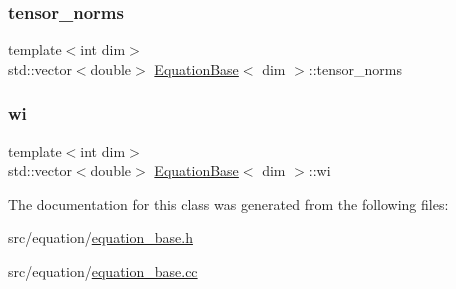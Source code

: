 \mbox{\label{class_equation_base_a2e5e8e486a1e6994c606dc05227752dd}} 
\subsubsection{\texorpdfstring{tensor\+\_\+norms}{tensor\_norms}}
{\footnotesize\ttfamily template$<$int dim$>$ \\
std\+::vector$<$double$>$ \hyperlink{class_equation_base}{Equation\+Base}$<$ dim $>$\+::tensor\+\_\+norms\hspace{0.3cm}{\ttfamily [protected]}}

\mbox{\label{class_equation_base_a46388ad4bea156033fa98fd8f484a068}} 
\subsubsection{\texorpdfstring{wi}{wi}}
{\footnotesize\ttfamily template$<$int dim$>$ \\
std\+::vector$<$double$>$ \hyperlink{class_equation_base}{Equation\+Base}$<$ dim $>$\+::wi\hspace{0.3cm}{\ttfamily [protected]}}



The documentation for this class was generated from the following files\+:\begin{DoxyCompactItemize}
\item 
src/equation/\hyperlink{equation__base_8h}{equation\+\_\+base.\+h}\item 
src/equation/\hyperlink{equation__base_8cc}{equation\+\_\+base.\+cc}\end{DoxyCompactItemize}
